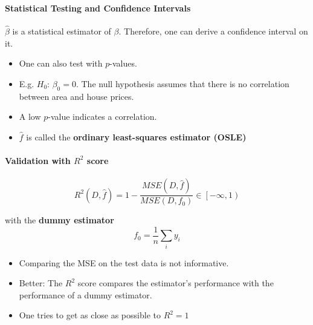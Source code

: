 
\paragraph{Statistical Testing and Confidence Intervals}


$\hat{\beta}$ is a statistical estimator of $\beta$. Therefore, one can derive a confidence interval on it.


\begin{itemize}
    \item One can also test with $p$-values.
    \item E.g. $H_0$: $\beta_0=0$. The null hypothesis assumes that there is no correlation between area and house prices.
    \item A low $p$-value indicates a correlation.
\end{itemize}


\begin{itemize}
    \item $\hat{f}$ is called the \textbf{ordinary least-squares estimator (OSLE)}
\end{itemize}

\paragraph[Validation with R2]{Validation with $R^2$ score}
\begin{equation*}
    R^2(D,\hat{f})=1-\frac{MSE(D,\hat{f})}{MSE(D,f_0)}\in\left[-\infty,1\right) %
\end{equation*}

with the \textbf{dummy estimator}
\begin{equation*}
    f_0=\frac1n\sum_{i}{y_i}
\end{equation*}


\begin{itemize}
    \item Comparing the MSE on the test data is not informative.
    \item Better: The $R^2$ score compares the estimator's performance with the performance of a dummy estimator.
    \item One tries to get as close as possible to $R^2=1$
\end{itemize}

